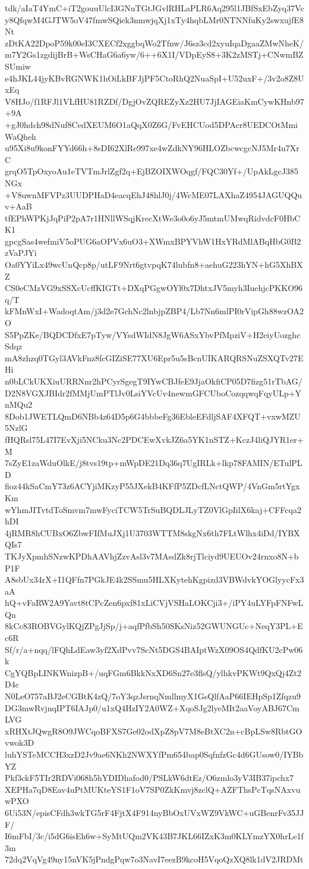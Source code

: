 tdk/aIaT4YmC+iT2gouuUlcI3GNuTGtJGvlRHLaPLR6Aq295l1JBfSxEbZyq37Vc
y8QfqwM4GJTW5oV47fmwSQiek3nmwjqXj1xTy4hqbLMr0NTNNfuKy2swxujfE8Nt
zDtKA22DpoP59k00eI3CXECf2xggbqWo2Tfnw/J6sz3cd2xyuIqaDgaaZMwNheK/
m7Y2Gs1zgdijBrB+WsCHaG6a6yw/6++6X1I/VDpEyS8+3K2zMSTj+CNwmBZSUmiw
e4hJKL44jyKBvRGNWK1hOiLkBFJjPF5CtoRhQ2NuaSpI+U52uxF+/3v2o8Z8UxEq
V8HJo/f1RFJl1VLfHU81RZDf/DgjOvZQREZyXz2HU7JjIAGEiaKmCywKHnb97+9A
+gJ0hdch98dNuf8CedXEUM6O1aQqX0Z6G/FvEHCUod5DPAcr8UEDCOtMmiWaQheh
u95Xi8u9konFYYd66h+8sDI62XlRe997xe4wZdkNY96HLOZbcwcgcNJ5Mr4u7XrC
grqO5TpOxyoAu1eTVTmJrlZgf2q+EjBZOIXWOqgf/FQC30Yf+/UpAkLgcJ385NGx
+V8uwnMFVPz3UUDPHaD4eacqEhJ48hlJ0j/4WcME07LAXhaZ4954JAGUQQuv+AaB
tfEPhWPKjJqPiP2pA7r1HNllWSqjKrecXtWe3o0o6yJ5mtmUMwqRidvdcF0HbCK1
gpcgSas4wefmiV5oPUG6aOPVx6uO3+XWmxBPYVhW1HxYRdMlABqHbG0B2zVaPJYi
Oa0YYiLx49wcUnQcp8p/utLF9Nrt6gtvpqK74lubfn8+aehuG223hYN+hG5XhBXZ
CS0eCMzVG9xSSXcUcffKIGTt+DXqPGgwOYl0x7DhtxJV5myh3IuehjcPKKO96q/T
kFMnWxI+WadoqtAm/j3d2e7GchNc2lnbjpZBP4/Lb7Nn6mlPI0rVipGh88wzOA2O
S5PpZKe/BQDCDfxE7pTyw/VYsdWIdN8JgW6ASxYbvPfMpziV+H2eiyUozghcSdqz
mA8zhzq0TGyl3AVkFnz8fcGIZiSE77XU6Epr5u5sBcnUIKARQRSNuZSXQTv27EHi
n0bLCkUKXiuURRNnr2hPCyrSgegT9IYwCBJfeE9JjaOkfiCP05D7fizg51rTbAG/
D2N8VGXJBIdr2fMMjUmPTlJv0LsiYVcUv4newmGFCUboCozqqwqFqyULp+YnMQu2
8Dob1JWETLQmD6NBb4z64D5p6G4bbbeFg36EbleEFdljSAF4XFQT+vxwMZU5NzlG
fHQRsl75L47I7EvXji5NCku3Nc2PDCEwXvkJZ6a5YK1nSTZ+KczJ4liQJYR1er+M
7sZyE1zaWduOlkE/j8tvs19tp+mWpDE21Dq36q7UgIRLk+lkp78FAMIN/ETulPLD
fioz44kSaCmY73z6ACYjiMKzyP55JXekB4KFfP5ZDcfLNctQWP/4VnGm5rtYgxKm
wYhmJITvtdToSmvm7mwFyciTCW5TrSuBQDLJLyTZ0VlGpIilX6kaj+CFFcqa2hDI
4jRMR8hCUBxO6ZbwFIfMuJXj1U3703WTTM8skgNx6th7FLtWlhx4iDd/IYBXQIs7
TKJyXpmhSNzwKPDhAAVhjZzvAsl3v7MAsdZk8rjTlciyd9UEUOv24rnxo8N+bP1F
A8sbUx34rX+I1QFfn7PGkJE4k2SSmu5HLXKytehKgpizd3VBWdvkYOGlyycFx3aA
hQ+vFaRW2A9Yavt8tCPcZen6pxf81xLiCVjVSHaLOKCji3+/iPY4uLYFpFNFwLQn
8kCc83ROBVGylKQjZPgJjSp/j+aqfPfbSh50SKsNiz52GWUNGUc+NeqY3PL+Ec6R
Sf/r/a+nqq/lFQhLdEaw3yf2XdPvv7ScNt5DGS4BAIptWzX09OS4QdfKU2cPw06k
CgYQBpLINKWnizpB+/uqFGm6BkkNxXD6Sn27e3flsQ/ylhkvPKWt9QxQj4Zt2D4c
N0LeO757aBJ2eCGBtK4zQ/7oY3qzJsrnqNmllmyX1GsQlfAaP66IEHpSp1Zfqzu9
DG3mwRvjnqIPT6IAJp0/u1xQ4HzIY2A0WZ+XqoSJg2lyeMIt2aaVoyABJ67CmLVG
xRHXtJQwgR8O9JWCqoBFXS7Ge02odXpZ8pV7M8eBtXC2n+cBpLSw8RbtGOvwok3D
luhYSTeMCCH3xzD2Jv9ae6NKh2NWXYfPm654bap0SqfnfzGc4d6GUsow0/IYBbYZ
Pkf3ckF5TIr2RDVi068h5hYDIDhafod0/PSLkW6dtEz/O6zmlo3yV3IB37ipchx7
XEPHa7qD8Eav4uPtMUKteYS1F1oV7SP0ZkKmvj8zclQ+AZFThsPcTqsNAxvuwPXO
6Ui53N/episCFdh3wkTG5rF4FjtX4F914nyBbOxUVxWZ9VkWC+uGBenrFv35JJF/
I6mFbI/3c/i5dG6isEh6w+SyMtUQm2VK43B7JKL66IZxK3m0KLYmzYX0hrLe1f3m
72dq2VqVg49ny15nVK5jPndgPqw7o3NavI7eezB9kcoH5VqoQzXQ8lk1dV2JRDMt
